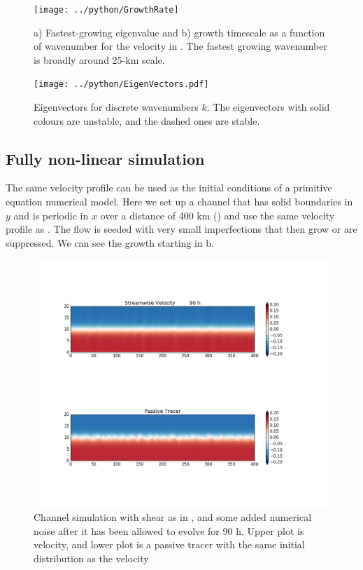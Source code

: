 \documentclass[11pt]{article}
\begin{document}
\begin{figure}[hbtp]
  \begin{center}
    \texttt{[image: ../python/GrowthRate]}
  \end{center}
  \caption{a) Fastest-growing eigenvalue and b) growth timescale as a function
of wavenumber for the velocity in .  The fastest
growing wavenumber is broadly around 25-km scale.}
  \label{fig:GrowthRate}
\end{figure}

\begin{figure}[hbtp]
  \begin{center}
    \texttt{[image: ../python/EigenVectors.pdf]}
  \end{center}
  \caption{Eigenvectors for discrete wavenumbers $k$.  The eigenvectors with
solid colours are unstable, and the dashed ones are stable.}
  \label{fig:EigenVectors}
\end{figure}

\clearpage
\subsection{Fully non-linear simulation}

The same velocity profile can be used as the initial conditions of a primitive
equation numerical model.  Here we set up a channel that has solid boundaries
in $y$ and is periodic in $x$ over a distance of 400 km ()
and use the same velocity profile as .  The flow is
seeded with very small imperfections that then grow or are suppressed.  We can
see the growth starting in b.  

\begin{figure}[hbtp]
  \begin{center}
\includegraphics[width=5in]{images/ChanPar040000324000}
  \end{center}
  \caption{Channel simulation with shear as in , and
some added numerical noise after it has been allowed to evolve for 90 h.  Upper
plot is velocity, and lower plot is a passive tracer with the same initial
distribution as the velocity }
  \label{fig:ChanPar01}
\end{figure}
\end{document}
